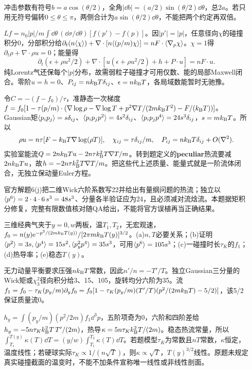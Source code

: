 \begin{solution}
冲击参数有符号$b=a\cos(\theta/2)$，全角$|\dd b|=(a/2)\sin(\theta/2)\dd\theta$，总$2a$。若只用无符号偏转$0\le\theta\le\pi$，两侧合计为$a\sin(\theta/2)\dd\theta$，不能把两个约定再双倍。

$Lf=n_0|p|/m\int\dd\theta\,(\dd\sigma/\dd\theta)[f(p')-f(p)]$。因$|p'|=|p|$，任意径向$\chi$的碰撞积分0，分部积分给$\partial_t(n\langle \chi\rangle)+\nabla\cdot[n\langle (p/m)\chi\rangle]=nF\cdot\langle \nabla_p\chi\rangle$。$\chi=1$得$\partial_t\rho+\nabla\cdot\rho u=0$；能量得
\begin{equation}
\partial_t(\epsilon+\rho u^2/2)+\nabla\cdot[u(\epsilon+\rho u^2/2)+h+P\cdot u]=nF\cdot u.
\end{equation}
纯Lorentz气还保每个$|p|$分布，故需弱粒子碰撞才可用仅数、能的局部Maxwell闭合。零阶$u=h=0$、$P_{ij}=nk_{\mathrm B} T\delta_{ij}$、$\epsilon=nk_{\mathrm B} T$，各局域数能暂时无驰豫。

令$C=-(f-f_0)/\tau$，准静态一次梯度$f=f_0[1-\tau(p/m)\cdot(\nabla\log\rho-\nabla\log T+p^2\nabla T/(2mk_{\mathrm B} T^2)-F/(k_{\mathrm B} T))]$。Gaussian矩$\langle p_ip_j\rangle=s\delta_{ij}$、$\langle p_ip_jp^2\rangle=4s^2\delta_{ij}$、$\langle p_ip_jp^4\rangle=24s^3\delta_{ij}$，$s=mk_{\mathrm B} T$。所以
\begin{equation}
\rho u=n\tau[F-k_{\mathrm B} T\nabla\log(\rho T)],\quad \chi_{ij}=\tau\delta_{ij}/m,\quad P_{ij}=nk_{\mathrm B} T\delta_{ij}+O(\nabla^2).
\end{equation}
实验室能流$Q=2nk_{\mathrm B} Tu-2n\tau k_{\mathrm B}^2T\nabla T/m$。转到题定义的\textbf{peculiar}热流要减$2nk_{\mathrm B} Tu$，故$h=-2n\tau k_{\mathrm B}^2T\nabla T/m$。把这些代上述质量、能量式就是一阶流体闭合，无独立保动量Euler方程。

官方解题6(j)把二维Wick六阶系数写22并给出有量纲问题的热流；独立以$\langle p^6\rangle=2\cdot4\cdot6\,s^3=48s^3$、分量各半验证应为24，且必须减对流焓流。本题据矩积分修复，完整有限数值核对随QA给出，不能将官方误植再当正确结果。
\end{solution}
\begin{exercise}[原题7(a)--(e)]\label{r:333-2-7}
三维经典气夹于$y=0,w$两板，温$T_1,T_2$，无宏观速，$f_0=n(y)\mathrm e^{-p^2/(2mk_{\mathrm B} T(y))}/[2\pi mk_{\mathrm B} T(y)]^{3/2}$。(a)$n,T$必要关系；(b)证明$\langle p^2\rangle=3s,\langle p^4\rangle=15s^2,\langle p_y^2p^4\rangle=35s^3$，可用$\langle p^6\rangle=105s^3$；(c)一碰撞时长$\tau_K$的$f_1$；(d)热导率；(e)稳态$T(y)$。
\end{exercise}
\begin{solution}
无力动量平衡要求压强$nk_{\mathrm B} T$常数，因此$n'/n=-T'/T$。独立Gaussian三分量的Wick矩或$\chi^2_3$径向积分给3、15、105，旋转均分六阶为35。流$f_1=f_0-\tau_K(p_y/m)\partial_yf_0=f_0[1-\tau_K(p_y/m)(T'/T)(p^2/(2mk_{\mathrm B} T)-5/2)]$，该5/2保证质量流0。

$h_y=\int(p_y/m)(p^2/2m)f_1\dd^3p$，五阶项奇为0，六阶和四阶差给$h_y=-5n\tau_Kk_{\mathrm B}^2T\,T'/(2m)$，热导$\kappa=5n\tau_Kk_{\mathrm B}^2T/(2m)$。稳态热流常量，所以$\int_{T_1}^{T(y)}\kappa(T)\dd T=(y/w)\int_{T_1}^{T_2}\kappa(T)\dd T$。若题模型$\tau_K$为常数且$nT$常数，$\kappa$恒定，温度线性；若硬球实际$\tau_K\propto1/(n\sqrt T)$，则$\kappa\propto\sqrt T$，$T(y)^{3/2}$线性。原题未规定真实碰撞截面的温变时，不能不加条件宣称唯一线性或非线性剖面。
\end{solution}
